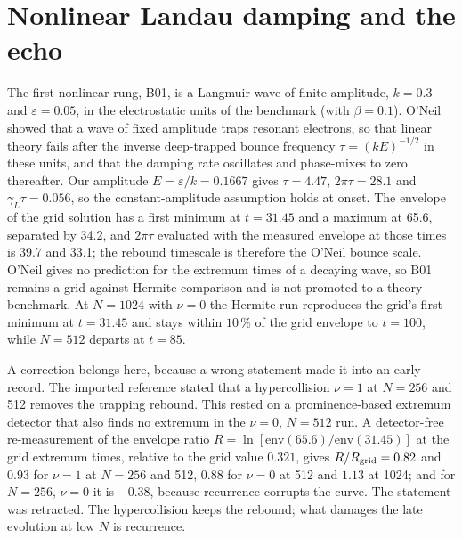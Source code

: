 \begin{table}[t]
\caption{B05: Buneman growth rate against the kinetic root; $N_n=16$, $N_x=5$. Root columns give $\omega_r+\ii\gamma$.}\label{tab:b05}
\small
{}
\end{table}

\section{Nonlinear Landau damping and the echo}\label{sec:nonlinear}

The first nonlinear rung, B01, is a Langmuir wave of finite amplitude, $k=0.3$ and $\varepsilon=0.05$, in the electrostatic units of the benchmark (with $\beta=0.1$). O'Neil~\cite{ONeil1965} showed that a wave of fixed amplitude traps resonant electrons, so that linear theory fails after the inverse deep-trapped bounce frequency $\tau=(kE)^{-1/2}$ in these units, and that the damping rate oscillates and phase-mixes to zero thereafter. Our amplitude $E=\varepsilon/k=0.1667$ gives $\tau=4.47$, $2\pi\tau=28.1$ and $\gamma_L\tau=0.056$, so the constant-amplitude assumption holds at onset. The envelope of the grid solution has a first minimum at $t=31.45$ and a maximum at 65.6, separated by 34.2, and $2\pi\tau$ evaluated with the measured envelope at those times is 39.7 and 33.1; the rebound timescale is therefore the O'Neil bounce scale. O'Neil gives no prediction for the extremum times of a decaying wave, so B01 remains a grid-against-Hermite comparison and is not promoted to a theory benchmark. At $N=1024$ with $\nu=0$ the Hermite run reproduces the grid's first minimum at $t=31.45$ and stays within $10\,\%$ of the grid envelope to $t=100$, while $N=512$ departs at $t=85$.

A correction belongs here, because a wrong statement made it into an early record. The imported reference stated that a hypercollision $\nu=1$ at $N=256$ and 512 removes the trapping rebound. This rested on a prominence-based extremum detector that also finds no extremum in the $\nu=0$, $N=512$ run. A detector-free re-measurement of the envelope ratio $R=\ln[\mathrm{env}(65.6)/\mathrm{env}(31.45)]$ at the grid extremum times, relative to the grid value $0.321$, gives $R/R_{\rm grid}=0.82$ and $0.93$ for $\nu=1$ at $N=256$ and 512, $0.88$ for $\nu=0$ at 512 and $1.13$ at 1024; and for $N=256$, $\nu=0$ it is $-0.38$, because recurrence corrupts the curve. The statement was retracted. The hypercollision keeps the rebound; what damages the late evolution at low $N$ is recurrence.

